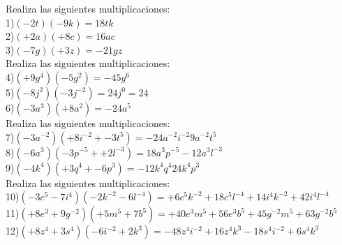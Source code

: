 \documentclass[a4paper,12pt]{article}
\begin{document}
 \pagebreak 
Realiza las siguientes multiplicaciones: \vspace{1cm}\\ 
1)$(-2t)(-9k)=18tk $\vspace{1cm}\\ 
2)$(+2a)(+8c)=16ac $\vspace{1cm}\\ 
3)$(-7g)(+3z)=-21gz $\vspace{1cm}\\ 
Realiza las siguientes multiplicaciones: \vspace{1cm}\\ 
4)$(+9g^{4})(-5g^{2} )=-45g^{6} $\vspace{1cm}\\ 
5)$(-8j^{2})(-3j^{-2} )=24j^{0}=24 $\vspace{1cm}\\ 
6)$(-3a^{3})(+8a^{2} )=-24a^{5} $\vspace{1cm}\\ 
Realiza las siguientes multiplicaciones: \vspace{1cm}\\ 
7)$(-3a^{-2})(+8i^{-2}+-3t^{5} )= -24a^{-2}i^{-2}9a^{-2}t^{5}   $\vspace{1cm}\\ 
8)$(-6a^{3})(-3p^{-5}++2l^{-3} )= 18a^{3}p^{-5}-12a^{3}l^{-3}   $\vspace{1cm}\\ 
9)$(-4k^{4})(+3q^{4}+-6p^{3} )= -12k^{4}q^{4}24k^{4}p^{3}   $\vspace{1cm}\\ 
Realiza las siguientes multiplicaciones: \vspace{1cm}\\ 
10)$(-3c^{5}-7i^{4} )(-2k^{-2}-6l^{-4} )= +6c^{5}k^{-2}+18c^{5}l^{-4}+14i^{4}k^{-2}+42i^{4}l^{-4}$\vspace{1cm}\\ 
11)$(+8e^{3}+9g^{-2} )(+5m^{5}+7b^{5} )= +40e^{3}m^{5}+56e^{3}b^{5}+45g^{-2}m^{5}+63g^{-2}b^{5}$\vspace{1cm}\\ 
12)$(+8z^{4}+3s^{4} )(-6i^{-2}+2k^{3} )= -48z^{4}i^{-2}+16z^{4}k^{3}-18s^{4}i^{-2}+6s^{4}k^{3}$\vspace{1cm}\\ 
\end{document}
